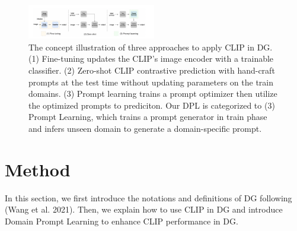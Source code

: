 \documentclass[11pt,twocolumn]{article}
\begin{document}
\begin{figure}
    \centering
    \includegraphics[width =0.5\textwidth]{Image2.png}
    \caption{The concept illustration of three approaches to apply CLIP in DG. (1) Fine-tuning updates the CLIP's image encoder with a trainable classifier. (2) Zero-shot CLIP contrastive prediction with hand-craft prompts at the test time without updating parameters on the train domains. (3) Prompt learning trains a prompt optimizer then utilize the optimized prompts to prediciton. Our DPL is categorized to (3) Prompt Learning, which trains a prompt generator in train phase and infers unseen domain to generate a domain-specific prompt.}
    \label{fig:fig2}
\end{figure}
\section{Method}
In this section, we first introduce the notations and definitions of DG following (Wang et al. 2021). Then, we explain how to use CLIP in DG and introduce Domain Prompt Learning to enhance CLIP performance in DG.
\end{document}
